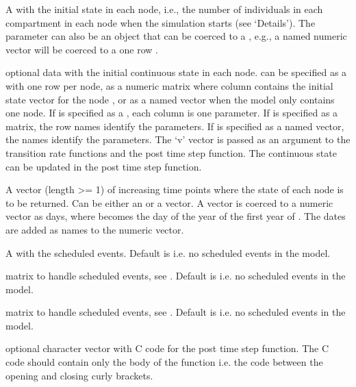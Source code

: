 \documentclass[letterpaper]{book}
\begin{document}
\begin{Arguments}
\begin{ldescription}
\item[\code{u0}] A  with the initial state in each node,
i.e., the number of individuals in each compartment in each
node when the simulation starts (see `Details'). The
parameter  can also be an object that can be coerced
to a , e.g., a named numeric vector will be
coerced to a one row .

\item[\code{v0}] optional data with the initial continuous state in each
node.  can be specified as a  with
one row per node, as a numeric matrix where column  contains the initial state vector for the node ,
or as a named vector when the model only contains one node. If
 is specified as a , each column is
one parameter. If  is specified as a matrix, the row
names identify the parameters. If  is specified as a
named vector, the names identify the parameters. The
`v' vector is passed as an argument to the transition
rate functions and the post time step function. The continuous
state can be updated in the post time step function.

\item[\code{tspan}] A vector (length >= 1) of increasing time points
where the state of each node is to be returned. Can be either
an  or a  vector. A 
vector is coerced to a numeric vector as days, where
 becomes the day of the year of the first year
of . The dates are added as names to the numeric
vector.

\item[\code{events}] A  with the scheduled
events. Default is  i.e. no scheduled events in the
model.

\item[\code{E}] matrix to handle scheduled events, see
. Default is 
i.e. no scheduled events in the model.

\item[\code{N}] matrix to handle scheduled events, see
. Default is 
i.e. no scheduled events in the model.

\item[\code{pts\_fun}] optional character vector with C code for the post
time step function. The C code should contain only the body of
the function i.e. the code between the opening and closing
curly brackets.


\end{ldescription}
\end{Arguments}
\end{document}
